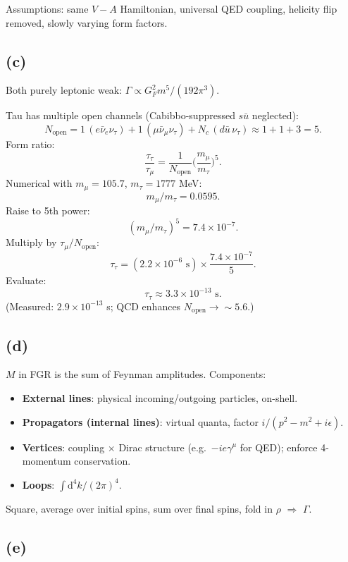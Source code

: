 \documentclass[11pt]{article}
\newcommand{\de}{\mathrm{d}}
\begin{document}
Assumptions: same $V-A$ Hamiltonian, universal QED coupling, helicity flip removed, slowly varying form factors.

\subsection*{(c)}

Both purely leptonic weak: $\Gamma\propto G_F^2 m^5/(192\pi^3)$.

Tau has multiple open channels (Cabibbo-suppressed $s\bar u$ neglected):
\[ N_{\text{open}} = 1\,(e\bar\nu_e\nu_\tau) + 1\,(\mu\bar\nu_\mu\nu_\tau) + N_c\,(d\bar u\,\nu_\tau) \approx 1+1+3 = 5. \]
Form ratio:
\[ \frac{\tau_\tau}{\tau_\mu} = \frac{1}{N_{\text{open}}}\Big(\frac{m_\mu}{m_\tau}\Big)^5. \]
Numerical with $m_\mu = 105.7$, $m_\tau = 1777$ MeV:
\[ m_\mu/m_\tau = 0.0595. \]
Raise to 5th power:
\[ (m_\mu/m_\tau)^5 = 7.4\times 10^{-7}. \]
Multiply by $\tau_\mu/N_{\text{open}}$:
\[ \tau_\tau = (2.2\times 10^{-6}\text{ s})\times \frac{7.4\times 10^{-7}}{5}. \]
Evaluate:
\[ \boxed{\;\tau_\tau \approx 3.3\times 10^{-13}\text{ s}.\;} \]
(Measured: $2.9\times 10^{-13}$ s; QCD enhances $N_{\text{open}}\to\sim 5.6$.)

\subsection*{(d)}

$M$ in FGR is the sum of Feynman amplitudes. Components:
\begin{itemize}
\item \textbf{External lines}: physical incoming/outgoing particles, on-shell.
\item \textbf{Propagators (internal lines)}: virtual quanta, factor $i/(p^2-m^2+i\epsilon)$.
\item \textbf{Vertices}: coupling $\times$ Dirac structure (e.g.\ $-ie\gamma^\mu$ for QED); enforce 4-momentum conservation.
\item \textbf{Loops}: $\int \de^4 k/(2\pi)^4$.
\end{itemize}
Square, average over initial spins, sum over final spins, fold in $\rho$ $\Rightarrow$ $\Gamma$.

\subsection*{(e)}
\end{document}
